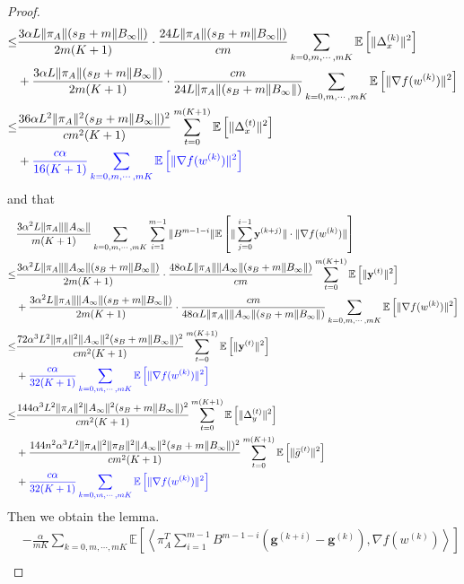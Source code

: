 \documentclass{article}
\newcommand{\vg}{{\mathbf{g}}}
\newcommand{\vy}{{\mathbf{y}}}
\newcommand{\EE}[1]{\mathbb{E}\left[#1\right]}
\newcommand{\norm}[1]{\| #1 \|}
\newcommand{\ip}[1]{\left\langle#1\right\rangle}
\begin{document}
\begin{proof}
\begin{align*}
    \leq&\frac{3\alpha L\norm{\pi_A}(s_B+m\norm{B_{\infty}})}{2m(K+1)}\cdot \frac{24L\norm{\pi_A}(s_B+m\norm{B_{\infty}})}{cm}\sum_{k=0,m,\cdots,mK}\EE{\norm{\Delta_x^{(k)}}^2}\\&+\frac{3\alpha L\norm{\pi_A}(s_B+m\norm{B_{\infty}})}{2m(K+1)}\cdot \frac{cm}{24L\norm{\pi_A}(s_B+m\norm{B_{\infty}})}\sum_{k=0,m,\cdots,mK}\EE{ \norm{\nabla f(w^{(k)})}^2}
    \\\leq&\frac{36\alpha L^2\norm{\pi_A}^2(s_B+m\norm{B_{\infty}})^2}{cm^2(K+1)}\sum_{t=0}^{m(K+1)}\EE{\norm{\Delta_x^{(t)}}^2}\\&+\textcolor{blue}{\frac{c\alpha}{16(K+1)}\sum_{k=0,m,\cdots,mK}\EE{ \norm{\nabla f(w^{(k)})}^2}}
  \end{align*}
  and that 
  \begin{align*}
    &\frac{3\alpha^2 L\norm{\pi_A}\norm{A_{\infty}}}{m(K+1)}\sum_{k=0,m,\cdots,mK}\sum_{i=1}^{m-1}\norm{B^{m-1-i}}\EE{\norm{\sum_{j=0}^{i-1}\vy^{(k+j)}}\cdot \norm{\nabla f(w^{(k)})}}\\ 
    \leq & \frac{3\alpha^2 L\norm{\pi_A}\norm{A_{\infty}}(s_B+m\norm{B_{\infty}})}{2m(K+1)}\cdot\frac{48\alpha L\norm{\pi_A}\norm{A_{\infty}}(s_B+m\norm{B_{\infty}})}{cm}\sum_{t=0}^{m(K+1)}\EE{\norm{\vy^{(t)}}^2}\\&+\frac{3\alpha^2 L\norm{\pi_A}\norm{A_{\infty}}(s_B+m\norm{B_{\infty}})}{2m(K+1)}\cdot\frac{cm}{48\alpha L\norm{\pi_A}\norm{A_{\infty}}(s_B+m\norm{B_{\infty}})}\sum_{k=0,m,\cdots,mK}\EE{\norm{\nabla f(w^{(k)})}^2}
    \\\leq&\frac{72\alpha^3L^2\norm{\pi_A}^2\norm{A_{\infty}}^2(s_B+m\norm{B_{\infty}})^2}{cm^2(K+1)}\sum_{t=0}^{m(K+1)}\EE{\norm{\vy^{(t)}}^2}\\&+\textcolor{blue}{\frac{c\alpha}{32(K+1)}\sum_{k=0,m,\cdots,mK}\EE{\norm{\nabla f(w^{(k)})}^2}}
    \\\leq&\frac{144\alpha^3L^2\norm{\pi_A}^2\norm{A_{\infty}}^2(s_B+m\norm{B_{\infty}})^2}{cm^2(K+1)}\sum_{t=0}^{m(K+1)}\EE{\norm{\Delta_y^{(t)}}^2}
    \\&+\frac{144n^2\alpha^3L^2\norm{\pi_A}^2\norm{\pi_B}^2\norm{A_{\infty}}^2(s_B+m\norm{B_{\infty}})^2}{cm^2(K+1)}\sum_{t=0}^{m(K+1)}\EE{\norm{\bar{g}^{(t)}}^2}\\&+\textcolor{blue}{\frac{c\alpha}{32(K+1)}\sum_{k=0,m,\cdots,mK}\EE{\norm{\nabla f(w^{(k)})}^2}}
  \end{align*}
  Then we obtain the lemma.
  \begin{align*}
    &-\frac{\alpha}{mK}\sum_{k=0,m,\cdots,mK}\EE{\ip{\pi_A^T\sum_{i=1}^{m-1}B^{m-1-i}(\vg^{(k+i)}-\vg^{(k)}),\nabla f(w^{(k)})}}\\ 

\end{align*}
\end{proof}
\end{document}
